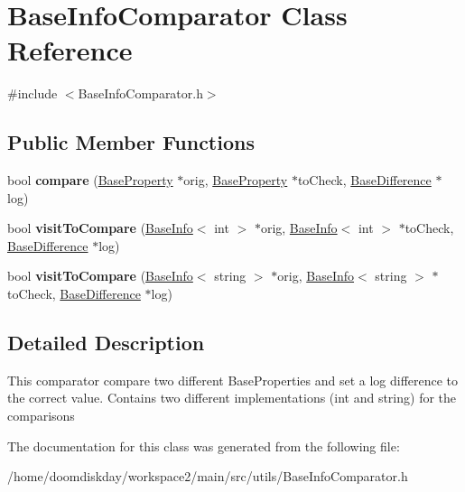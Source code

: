 \hypertarget{classBaseInfoComparator}{}\section{Base\+Info\+Comparator Class Reference}
\label{classBaseInfoComparator}


{\ttfamily \#include $<$Base\+Info\+Comparator.\+h$>$}

\subsection*{Public Member Functions}
\begin{DoxyCompactItemize}
\item 
bool {\bfseries compare} (\hyperlink{classBaseProperty}{Base\+Property} $\ast$orig, \hyperlink{classBaseProperty}{Base\+Property} $\ast$to\+Check, \hyperlink{classBaseDifference}{Base\+Difference} $\ast$log)\hypertarget{classBaseInfoComparator_ab9451e03f463dc4bcaa995c64916a1db}{}\label{classBaseInfoComparator_ab9451e03f463dc4bcaa995c64916a1db}

\item 
bool {\bfseries visit\+To\+Compare} (\hyperlink{classBaseInfo}{Base\+Info}$<$ int $>$ $\ast$orig, \hyperlink{classBaseInfo}{Base\+Info}$<$ int $>$ $\ast$to\+Check, \hyperlink{classBaseDifference}{Base\+Difference} $\ast$log)\hypertarget{classBaseInfoComparator_a5e80cb49f73f2a2bb6cdeac8e09e6dc3}{}\label{classBaseInfoComparator_a5e80cb49f73f2a2bb6cdeac8e09e6dc3}

\item 
bool {\bfseries visit\+To\+Compare} (\hyperlink{classBaseInfo}{Base\+Info}$<$ string $>$ $\ast$orig, \hyperlink{classBaseInfo}{Base\+Info}$<$ string $>$ $\ast$to\+Check, \hyperlink{classBaseDifference}{Base\+Difference} $\ast$log)\hypertarget{classBaseInfoComparator_a09e5add363c7e953fa09b40eae7843ee}{}\label{classBaseInfoComparator_a09e5add363c7e953fa09b40eae7843ee}

\end{DoxyCompactItemize}


\subsection{Detailed Description}
This comparator compare two different Base\+Properties and set a log difference to the correct value. Contains two different implementations (int and string) for the comparisons 

The documentation for this class was generated from the following file\+:\begin{DoxyCompactItemize}
\item 
/home/doomdiskday/workspace2/main/src/utils/Base\+Info\+Comparator.\+h\end{DoxyCompactItemize}
